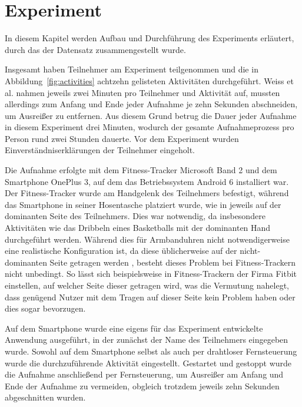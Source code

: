 \chapter{Experiment}
\label{chap:experiment}
In diesem Kapitel werden Aufbau und Durchführung des Experiments erläutert, durch das der Datensatz zusammengestellt wurde.

Insgesamt haben  Teilnehmer am Experiment teilgenommen und die in Abbildung~\ref{fig:activities} achtzehn gelisteten Aktivitäten durchgeführt. Weiss et al. nahmen jeweils zwei Minuten pro Teilnehmer und Aktivität auf\cite{Weiss2016}, mussten allerdings zum Anfang und Ende jeder Aufnahme je zehn Sekunden abschneiden, um Ausreißer zu entfernen. Aus diesem Grund betrug die Dauer jeder Aufnahme in diesem Experiment drei Minuten, wodurch der gesamte Aufnahmeprozess pro Person rund zwei Stunden dauerte. Vor dem Experiment wurden Einverständniserklärungen der Teilnehmer eingeholt.

Die Aufnahme erfolgte mit dem Fitness-Tracker Microsoft Band 2 und dem Smartphone OnePlus 3, auf dem das Betriebssystem Android 6 installiert war. Der Fitness-Tracker wurde am Handgelenk des Teilnehmers befestigt, während das Smartphone in seiner Hosentasche platziert wurde, wie in \cite{Weiss2016} jeweils auf der dominanten Seite des Teilnehmers. Dies war notwendig, da insbesondere Aktivitäten wie das Dribbeln eines Basketballs mit der dominanten Hand durchgeführt werden. Während dies für Armbanduhren nicht notwendigerweise eine realistische Konfiguration ist, da diese üblicherweise auf der nicht-dominanten Seite getragen werden , besteht dieses Problem bei Fitness-Trackern nicht unbedingt. So lässt sich beispielsweise in Fitness-Trackern der Firma Fitbit einstellen, auf welcher Seite dieser getragen wird, was die Vermutung nahelegt, dass genügend Nutzer mit dem Tragen auf dieser Seite kein Problem haben oder dies sogar bevorzugen. 

Auf dem Smartphone wurde eine eigens für das Experiment entwickelte Anwendung ausgeführt, in der zunächst der Name des Teilnehmers eingegeben wurde. Sowohl auf dem Smartphone selbst als auch per drahtloser Fernsteuerung wurde die durchzuführende Aktivität eingestellt. Gestartet und gestoppt wurde die Aufnahme anschließend per Fernsteuerung, um Ausreißer am Anfang und Ende der Aufnahme zu vermeiden, obgleich trotzdem jeweils zehn Sekunden abgeschnitten wurden.

